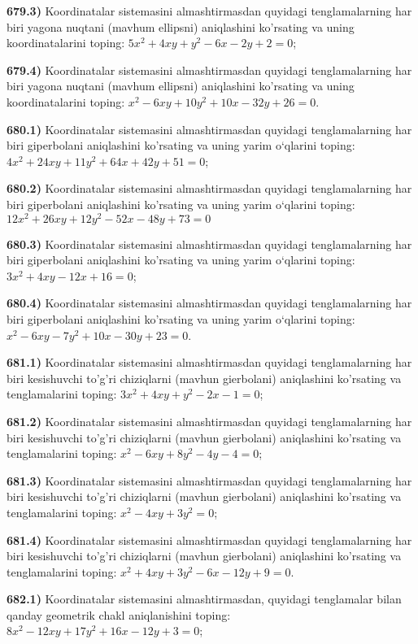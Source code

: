 \textbf{679.3)} Koordinatalar sistemasini almashtirmasdan quyidagi tenglamalarning har biri yagona nuqtani (mavhum ellipsni) aniqlashini ko'rsating va uning koordinatalarini toping: $5 x^2+4 x y+y^2-6 x-2 y+2=0$;

\textbf{679.4)} Koordinatalar sistemasini almashtirmasdan quyidagi tenglamalarning har biri yagona nuqtani (mavhum ellipsni) aniqlashini ko'rsating va uning koordinatalarini toping: $x^2-6 x y+10 y^2+10 x-32 y+26=0$.

\textbf{680.1)} Koordinatalar sistemasini almashtirmasdan quyidagi tenglamalarning har biri giperbolani aniqlashini ko'rsating va uning yarim o‘qlarini toping: $4 x^2+24 x y+11 y^2+64 x+42 y+51=0$;

\textbf{680.2)} Koordinatalar sistemasini almashtirmasdan quyidagi tenglamalarning har biri giperbolani aniqlashini ko'rsating va uning yarim o‘qlarini toping: $12 x^2+26 x y+12 y^2-52 x-48 y+73=0$

\textbf{680.3)} Koordinatalar sistemasini almashtirmasdan quyidagi tenglamalarning har biri giperbolani aniqlashini ko'rsating va uning yarim o‘qlarini toping: $3 x^2+4 x y-12 x+16=0$;

\textbf{680.4)} Koordinatalar sistemasini almashtirmasdan quyidagi tenglamalarning har biri giperbolani aniqlashini ko'rsating va uning yarim o‘qlarini toping: $x^2-6 x y-7 y^2+10 x-30 y+23=0$.

\textbf{681.1)} Koordinatalar sistemasini almashtirmasdan quyidagi tenglamalarning har biri kesishuvchi to'g'ri chiziqlarni (mavhun gierbolani) aniqlashini ko'rsating va tenglamalarini toping: $3 x^2+4 x y+y^2-2 x-1=0$;

\textbf{681.2)} Koordinatalar sistemasini almashtirmasdan quyidagi tenglamalarning har biri kesishuvchi to'g'ri chiziqlarni (mavhun gierbolani) aniqlashini ko'rsating va tenglamalarini toping: $x^2-6 x y+8 y^2-4 y-4=0$;

\textbf{681.3)} Koordinatalar sistemasini almashtirmasdan quyidagi tenglamalarning har biri kesishuvchi to'g'ri chiziqlarni (mavhun gierbolani) aniqlashini ko'rsating va tenglamalarini toping: $x^2-4 x y+3 y^2=0$;

\textbf{681.4)} Koordinatalar sistemasini almashtirmasdan quyidagi tenglamalarning har biri kesishuvchi to'g'ri chiziqlarni (mavhun gierbolani) aniqlashini ko'rsating va tenglamalarini toping: $x^2+4 x y+3 y^2-6 x-12 y+9=0$.

\textbf{682.1)} Koordinatalar sistemasini almashtirmasdan, quyidagi tenglamalar bilan qanday geometrik chakl aniqlanishini toping: $8 x^2-12 x y+17 y^2+16 x-12 y+3=0$;

